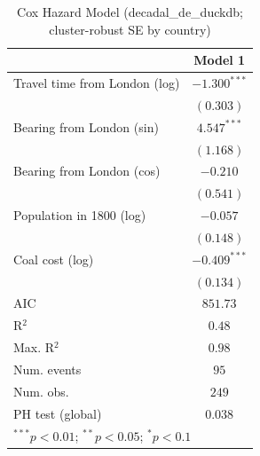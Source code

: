 
\begin{table}
\begin{center}
\begin{tabular}{l c}
\hline
 & Model 1 \\
\hline
Travel time from London (log) & $-1.300^{***}$ \\
 & $(0.303)$ \\
Bearing from London (sin) & $4.547^{***}$ \\
 & $(1.168)$ \\
Bearing from London (cos) & $-0.210$ \\
 & $(0.541)$ \\
Population in 1800 (log) & $-0.057$ \\
 & $(0.148)$ \\
Coal cost (log) & $-0.409^{***}$ \\
 & $(0.134)$ \\
\hline
AIC              & $851.73$ \\
R$^2$            & $0.48$ \\
Max. R$^2$       & $0.98$ \\
Num. events      & $95$ \\
Num. obs.        & $249$ \\
PH test (global) & $0.038$ \\
\hline
\multicolumn{2}{l}{\scriptsize{$^{***}p<0.01$; $^{**}p<0.05$; $^{*}p<0.1$}}
\end{tabular}
\caption{Cox Hazard Model (decadal\_de\_duckdb; cluster-robust SE by country)}
\label{tab:cox_serious_decadal_de_duckdb}
\end{center}
\end{table}
